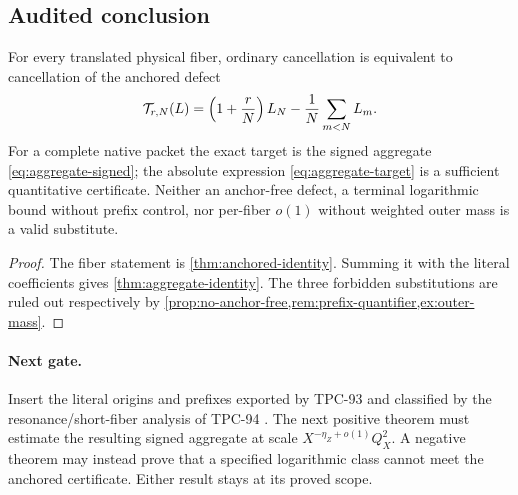 \subsection{Audited conclusion}

\begin{theorem}
\label{thm:conclusion}
For every translated physical fiber, ordinary cancellation is
equivalent to cancellation of the anchored defect
\[
 \mathcal T_{r,N}(L)
 =
 \left(1+\frac rN\right)L_N
 -\frac1N\sum_{m<N}L_m.
\]
For a complete native packet the exact target is the signed aggregate
\eqref{eq:aggregate-signed}; the absolute expression
\eqref{eq:aggregate-target} is a sufficient quantitative
certificate.  Neither an anchor-free defect, a terminal logarithmic
bound without prefix control, nor per-fiber \(o(1)\) without weighted
outer mass is a valid substitute.
\end{theorem}

\begin{proof}
The fiber statement is \cref{thm:anchored-identity}.  Summing it with
the literal coefficients gives \cref{thm:aggregate-identity}.  The
three forbidden substitutions are ruled out respectively by
\cref{prop:no-anchor-free,rem:prefix-quantifier,ex:outer-mass}.
\end{proof}

\paragraph{Next gate.}
Insert the literal origins and prefixes exported by TPC-93 and
classified by the resonance/short-fiber analysis of TPC-94
\citep{WangTPC94}.  The
next positive theorem must estimate the resulting signed aggregate at
scale \(X^{-\eta_Z+o(1)}Q_X^2\).  A negative theorem may instead
prove that a specified logarithmic class cannot meet the anchored
certificate.  Either result stays at its proved scope.
